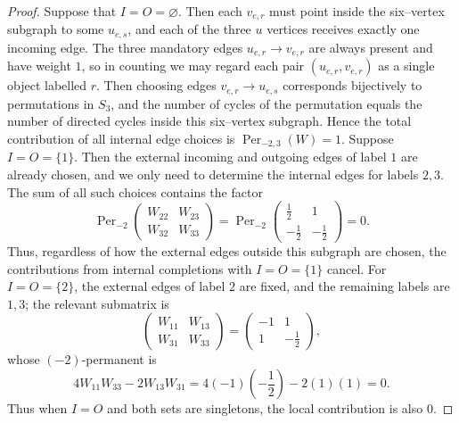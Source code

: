 \documentclass[10pt,a4paper]{amsart}
\begin{document}
\begin{proof}
Suppose that $I=O=\varnothing$. Then each $v_{e,r}$ must point inside the six–vertex subgraph to some $u_{e,s}$, and each of the three $u$ vertices receives exactly one incoming edge. The three mandatory edges $u_{e,r}\to v_{e,r}$ are always present and have weight $1$, so in counting we may regard each pair $(u_{e,r},v_{e,r})$ as a single object labelled $r$. Then choosing edges $v_{e,r}\to u_{e,s}$ corresponds bijectively to permutations in $S_3$, and the number of cycles of the permutation equals the number of directed cycles inside this six–vertex subgraph. Hence the total contribution of all internal edge choices is $\operatorname{Per}_{-2,3}(W)=1$. Suppose $I=O=\{1\}$. Then the external incoming and outgoing edges of label $1$ are already chosen, and we only need to determine the internal edges for labels $2,3$. The sum of all such choices contains the factor
\[
  \operatorname{Per}_{-2}
  \begin{pmatrix}
    W_{22}&W_{23}\\
    W_{32}&W_{33}
  \end{pmatrix}
  =\operatorname{Per}_{-2}
  \begin{pmatrix}
    \frac12&1\\[-1mm]
    -\frac12&-\frac12
  \end{pmatrix}=0.
\]
Thus, regardless of how the external edges outside this subgraph are chosen, the contributions from internal completions with $I=O=\{1\}$ cancel. For $I=O=\{2\}$, the external edges of label $2$ are fixed, and the remaining labels are $1,3$; the relevant submatrix is
\[
  \begin{pmatrix}
    W_{11}&W_{13}\\
    W_{31}&W_{33}
  \end{pmatrix}
  =
  \begin{pmatrix}
    -1&1\\
    1&-\frac12
  \end{pmatrix},
\]
whose $(-2)$-permanent is
\[
  4W_{11}W_{33}-2W_{13}W_{31}
  =4(-1)\left(-\frac12\right)-2(1)(1)=0.
\]
Thus when $I=O$ and both sets are singletons, the local contribution is also $0$.


\end{proof}
\end{document}
